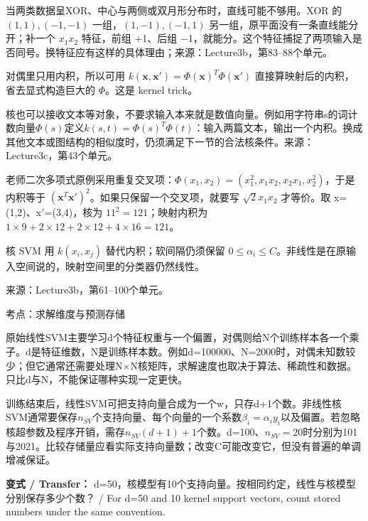 当两类数据呈XOR、中心与两侧或双月形分布时，直线可能不够用。XOR 的 \((1,1),(-1,-1)\) 一组，\((1,-1),(-1,1)\) 另一组，原平面没有一条直线能分开；补一个 \(x_1x_2\) 特征，前组 +1、后组 \ensuremath{-}1，就能分。这个特征捕捉了两项输入是否同号。换特征应有这样的具体理由；来源：Lecture3b，第83–88个单元。


对偶里只用内积，所以可用 \(k(\mathbf x,\mathbf x')=\Phi(\mathbf x)^T\Phi(\mathbf x')\) 直接算映射后的内积，省去显式构造巨大的 \(\Phi\)。这是 kernel trick。


核也可以接收文本等对象，不要求输入本来就是数值向量。例如用字符串s的词计数向量\(\Phi(s)\)定义\(k(s,t)=\Phi(s)^T\Phi(t)\)：输入两篇文本，输出一个内积。换成其他文本或图结构的相似度时，仍须满足下一节的合法核条件。来源：Lecture3c，第43个单元。


老师二次多项式原例采用重复交叉项：\(\Phi(x_1,x_2)=(x_1^2,x_1x_2,x_2x_1,x_2^2)\)，于是内积等于 \((\mathbf x^T\mathbf x')^2\)。如果只保留一个交叉项，就要写 \(\sqrt2x_1x_2\) 才等价。取 x=(1,2)、x\ensuremath{\prime}=(3,4)，核为 \(11^2=121\)；映射内积为 \(1\times9+2\times12+2\times12+4\times16=121\)。


核 SVM 用 \(k(x_i,x_j)\) 替代内积；软间隔仍须保留 \(0\le\alpha_i\le C\)。非线性是在原输入空间说的，映射空间里的分类器仍然线性。


来源：Lecture3b，第61–100个单元。








考点：求解维度与预测存储

原始线性SVM主要学习d个特征权重与一个偏置，对偶则给N个训练样本各一个乘子。d是特征维数，N是训练样本数。例如d=100000、N=2000时，对偶未知数较少；但它通常还需要处理N\ensuremath{\times}N核矩阵，求解速度也取决于算法、稀疏性和数据。只比d与N，不能保证哪种实现一定更快。


训练结束后，线性SVM可把支持向量合成为一个w，只存d+1个数。非线性核SVM通常要保存\(n_{SV}\)个支持向量、每个向量的一个系数\(\beta_i=\alpha_i y_i\)以及偏置。若忽略核超参数及程序开销，需存\(n_{SV}(d+1)+1\)个数。d=100、\(n_{SV}=20\)时分别为101与2021。比较存储量应看实际支持向量数；改变C可能改变它，但没有普遍的单调增减保证。


\textbf{变式 / Transfer：} d=50，核模型有10个支持向量。按相同约定，线性与核模型分别保存多少个数？ / For d=50 and 10 kernel support vectors, count stored numbers under the same convention.


